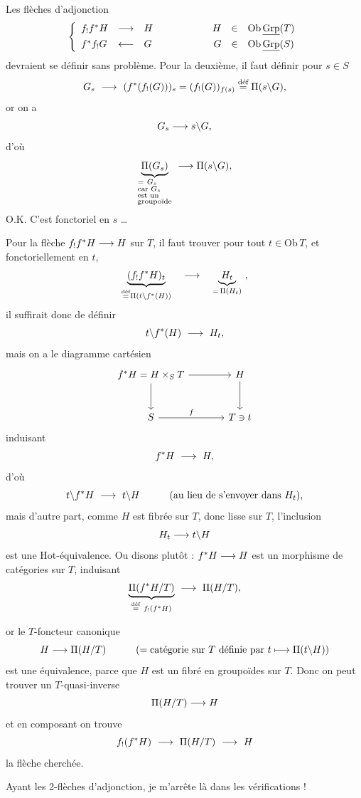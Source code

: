 Les flèches d'adjonction
\[
\left\{
\begin{array}{lclcrcl}
f_!f^*H & \longrightarrow & H & \qquad\qquad & H & \in & \mathrm{Ob}\,\underline{\mathrm{Grp}}(T)\\[4pt]
f^*f_!G & \longleftarrow & G & \qquad\qquad & G & \in & \mathrm{Ob}\,\underline{\mathrm{Grp}}(S)
\end{array}
\right.
\]
devraient se définir sans problème. Pour la deuxième, il faut définir pour $s \in S$
\[
G_s \ \longrightarrow\ (f^*(f_!(G)))_s = (f_!(G))_{f(s)} \overset{\text{déf}}{=} \Pi(s\backslash G),
\]
or on a
\[
G_s \longrightarrow s\backslash G,
\]
d'où
\[
\underbrace{\Pi(G_s)}_{\begin{subarray}{l} =\ G_s\\ \text{car } G_s\\ \text{est un}\\ \text{groupoïde}\end{subarray}} \ \longrightarrow \Pi(s\backslash G),
\]
O.K. C'est fonctoriel en $s$ \dots

Pour la flèche $f_!f^*H \longrightarrow H$ sur $T$, il faut trouver pour tout $t \in \mathrm{Ob}\,T$, et fonctoriellement en $t$,
\[
\underbrace{(f_!f^*H)_t}_{\overset{\text{déf}}{=}\Pi(t\backslash f^*(H))} \quad \longrightarrow \quad \underbrace{H_t}_{=\,\Pi(H_t)} \ ,
\]
il suffirait donc de définir
\[
t\backslash f^*(H) \ \longrightarrow\ H_t,
\]
mais on a le diagramme cartésien
\[
\begin{tikzcd}[column sep=large, row sep=large]
f^*H = H \times_S T \arrow[r] \arrow[d] & H \arrow[d] \\
S \arrow[r, "f"] & T \ni t
\end{tikzcd}
\]
 induisant
\[
f^*H \ \fl\ H,
\]
d'où
\[
t\backslash f^*H \ \fl\ t\backslash H \qquad\quad \text{(au lieu de s'envoyer dans $H_t$),}
\]
mais d'autre part, comme $H$ est fibrée sur $T$, donc lisse sur $T$, l'inclusion
\[
H_t \longrightarrow t\backslash H
\]
est une Hot-équivalence. Ou disons plutôt : $f^*H \longrightarrow H$ est un morphisme de catégories sur $T$, induisant
\[
\underbrace{\Pi(f^*H/T)}_{\overset{\text{déf}}{=}\ f_!(f^*H)} \ \fl\ \Pi(H/T),
\]

or le $T$-foncteur canonique
\[
H \longrightarrow \Pi(H/T) \qquad\quad (= \text{catégorie sur } T \text{ définie par } t \longmapsto \Pi(t\backslash H))
\]
est une équivalence, parce que $H$ est un fibré en groupoïdes sur $T$. Donc on peut trouver un $T$-quasi-inverse
\[
\Pi(H/T) \longrightarrow H
\]
et en composant on trouve
\[
f_!(f^*H) \ \fl\ \Pi(H/T) \ \fl\ H
\]
la flèche cherchée.

Ayant les 2-flèches d'adjonction, je m'arrête là dans les vérifications !


